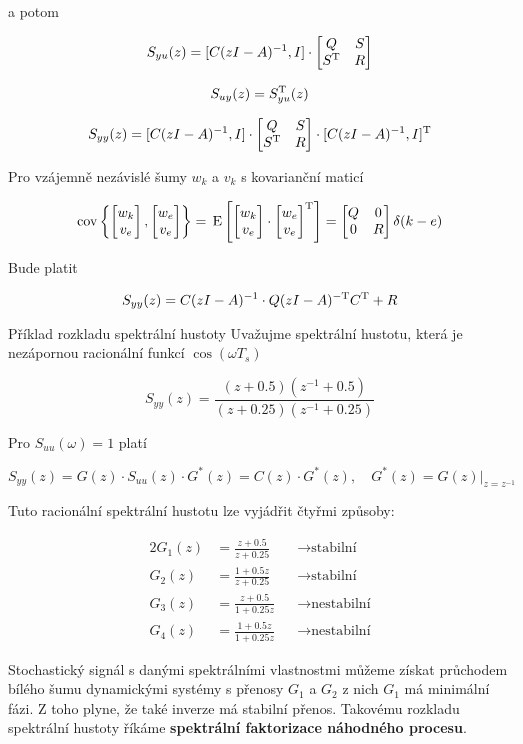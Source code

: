 a potom

\[
S_{yu}(z) = [C(zI-A)^{-1}, I]\cdot
\begin{bmatrix}
Q & S\\ S^{\mathrm{T}} & R
\end{bmatrix}
\]

\[ S_{uy}(z) = S^{\mathrm{T}}_{yu}(z) \]

\[ S_{yy}(z) = [C(zI-A)^{-1}, I]\cdot
\begin{bmatrix}
Q & S\\ S^{\mathrm{T}} & R
\end{bmatrix}\cdot [C(zI-A)^{-1}, I]^{\mathrm{T}}
\]

Pro vzájemně nezávislé šumy $w_k$ a $v_k$ s kovarianční maticí

\[ \mathrm{cov}\left\{ \begin{bmatrix} w_k\\v_e \end{bmatrix}, \begin{bmatrix} w_e\\ v_e \end{bmatrix} \right\} = \,\mathrm{E}\left[\begin{bmatrix} w_k\\v_e \end{bmatrix}\cdot \begin{bmatrix} w_e\\ v_e \end{bmatrix}^{\mathrm{T}}\right] = \begin{bmatrix}
Q & 0 \\ 0 & R
\end{bmatrix}\delta(k-e) \]

Bude platit

\[ S_{yy}(z) = C(zI-A)^{-1}\cdot Q(zI-A)^{-\mathrm{T}}C^{\mathrm{T}} + R \]

\begin{note}{Příklad rozkladu spektrální hustoty}
Uvažujme spektrální hustotu, která je nezápornou racionální funkcí $\cos(\omega T_s)$

\[ S_{yy}(z) = \frac{(z+0.5)(z^{-1}+0.5)}{(z+0.25)(z^{-1}+0.25)} \]

Pro $S_{uu}(\omega) = 1$ platí

\[ S_{yy}(z) = G(z)\cdot S_{uu}(z)\cdot G^*(z) = C(z)\cdot G^*(z),\quad G^*(z)=G(z)|_{z=z^{-1}} \]

Tuto racionální spektrální hustotu lze vyjádřit čtyřmi způsoby:

\begin{alignat*}{2}
G_1(z) & = \frac{z+0.5}{z+0.25} && \to \text{stabilní}\\
G_2(z) & = \frac{1+0.5z}{z+0.25} && \to \text{stabilní}\\
G_3(z) & = \frac{z+0.5}{1+0.25z} && \to \text{nestabilní}\\
G_4(z) & = \frac{1+0.5z}{1+0.25z} && \to \text{nestabilní}
\end{alignat*}

Stochastický signál s danými spektrálními vlastnostmi můžeme získat průchodem bílého šumu dynamickými systémy s přenosy $G_1$ a $G_2$ z nich $G_1$ má minimální fázi. Z toho plyne, že také inverze má stabilní přenos. Takovému rozkladu spektrální hustoty říkáme \textbf{spektrální faktorizace náhodného procesu}.
\end{note}

